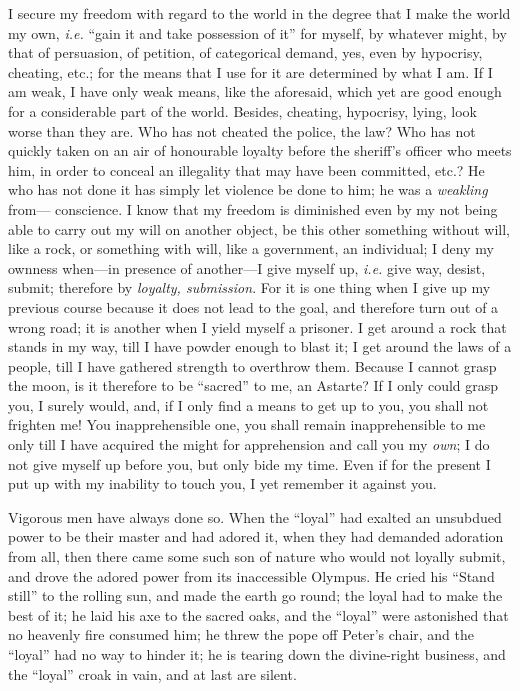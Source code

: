 I secure my freedom with regard to the world in the degree that I make the 
world my own, \textit{i.e.} ``gain it and take possession of it'' for 
myself, by whatever might, by that of persuasion, of petition, of categorical 
demand, yes, even by hypocrisy, cheating, etc.; for the means that I use for 
it are determined by what I am. If I am weak, I have only weak means, like the 
aforesaid, which yet are good enough for a considerable part of the world. 
Besides, cheating, hypocrisy, lying, look worse than they are. Who has not 
cheated the police, the law? Who has not quickly taken on an air of honourable 
loyalty before the sheriff's officer who meets him, in order to conceal an 
illegality that may have been committed, etc.? He who has not done it has 
simply let violence be done to him; he was a \textit{weakling} from--- 
conscience. I know that my freedom is diminished even by my not being able to 
carry out my will on another object, be this other something without will, 
like a rock, or something with will, like a government, an individual; I deny 
my ownness when---in presence of another---I give myself up, \textit{i.e.} 
give way, desist, submit; therefore by \textit{loyalty, submission}. For it is 
one thing when I give up my previous course because it does not lead to the 
goal, and therefore turn out of a wrong road; it is another when I yield 
myself a prisoner. I get around a rock that stands in my way, till I have 
powder enough to blast it; I get around the laws of a people, till I have 
gathered strength to overthrow them. Because I cannot grasp the moon, is it 
therefore to be ``sacred'' to me, an Astarte? If I only could grasp you, I 
surely would, and, if I only find a means to get up to you, you shall not 
frighten me! You inapprehensible one, you shall remain inapprehensible to me 
only till I have acquired the might for apprehension and call you my 
\textit{own}; I do not give myself up before you, but only bide my time. Even 
if for the present I put up with my inability to touch you, I yet remember it 
against you.

Vigorous men have always done so. When the ``loyal'' had exalted an 
unsubdued power to be their master and had adored it, when they had demanded 
adoration from all, then there came some such son of nature who would not 
loyally submit, and drove the adored power from its inaccessible Olympus. He 
cried his ``Stand still'' to the rolling sun, and made the earth go round; 
the loyal had to make the best of it; he laid his axe to the sacred oaks, and 
the ``loyal'' were astonished that no heavenly fire consumed him; he threw 
the pope off Peter's chair, and the ``loyal'' had no way to hinder it; he is 
tearing down the divine-right business, and the ``loyal'' croak in vain, and 
at last are silent.

